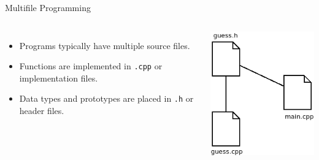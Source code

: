 \documentclass[]{beamer}
\begin{document}
\begin{frame}{Multifile Programming}
\begin{columns}
    \begin{itemize}[<+->]
        \item Programs typically have multiple source files.
        \item Functions are implemented in \texttt{.cpp} or
        implementation files.
        \item Data types and prototypes are placed in \texttt{.h} or
        header files.
    \end{itemize}

    \includegraphics[width=\textwidth]{images/multifile-program}
\end{columns}
\end{frame}
\end{document}
